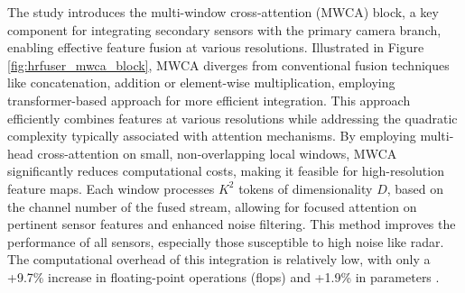 \documentclass[report.tex]{subfiles}
\begin{document}





    The study introduces the multi-window cross-attention (MWCA) block, a key component for integrating secondary sensors with the primary camera branch, enabling effective feature fusion at various resolutions. Illustrated in Figure \ref{fig:hrfuser_mwca_block}, MWCA diverges from conventional fusion techniques like concatenation, addition or element-wise multiplication, employing transformer-based approach for more efficient integration. This approach efficiently combines features at various resolutions while addressing the quadratic complexity typically associated with attention mechanisms. By employing multi-head cross-attention on small, non-overlapping local windows, MWCA significantly reduces computational costs, making it feasible for high-resolution feature maps. Each window processes \( K^2 \) tokens of dimensionality ${D}$, based on the channel number of the fused stream, allowing for focused attention on pertinent sensor features and enhanced noise filtering. This method improves the performance of all sensors, especially those susceptible to high noise like radar. The computational overhead of this integration is relatively low, with only a +9.7\% increase in floating-point operations (flops) and +1.9\% in parameters \cite{broedermann2022hrfuser}.
\end{document}
